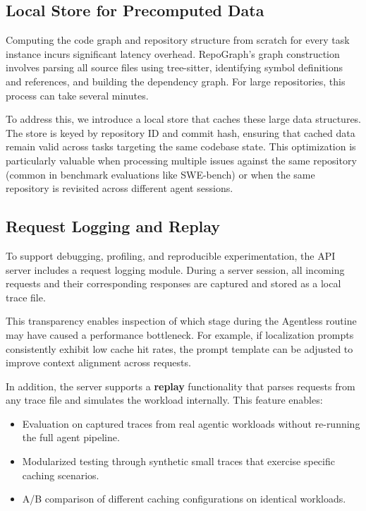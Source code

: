 \subsection{Local Store for Precomputed Data}
\label{sec:local_store}

Computing the code graph and repository structure from scratch for every task instance incurs significant latency overhead. RepoGraph's graph construction involves parsing all source files using tree-sitter, identifying symbol definitions and references, and building the dependency graph. For large repositories, this process can take several minutes.

To address this, we introduce a local store that caches these large data structures. The store is keyed by repository ID and commit hash, ensuring that cached data remain valid across tasks targeting the same codebase state. This optimization is particularly valuable when processing multiple issues against the same repository (common in benchmark evaluations like SWE-bench) or when the same repository is revisited across different agent sessions.

\subsection{Request Logging and Replay}
\label{sec:request_logging}

To support debugging, profiling, and reproducible experimentation, the API server includes a request logging module. During a server session, all incoming requests and their corresponding responses are captured and stored as a local trace file. 

This transparency enables inspection of which stage during the Agentless routine may have caused a performance bottleneck. For example, if localization prompts consistently exhibit low cache hit rates, the prompt template can be adjusted to improve context alignment across requests.

In addition, the server supports a \textbf{replay} functionality that parses requests from any trace file and simulates the workload internally. This feature enables:
\begin{itemize}
    \item Evaluation on captured traces from real agentic workloads without re-running the full agent pipeline.
    \item Modularized testing through synthetic small traces that exercise specific caching scenarios.
    \item A/B comparison of different caching configurations on identical workloads.
\end{itemize}

